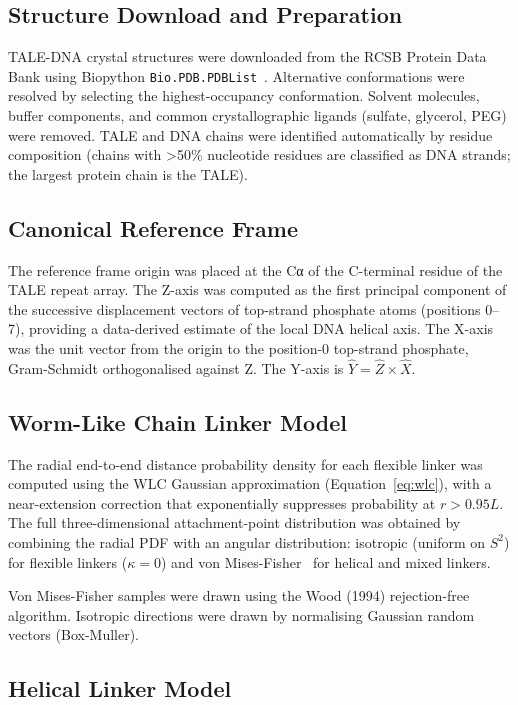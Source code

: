 \documentclass[11pt,a4paper]{article}
\begin{document}
\subsection{Structure Download and Preparation}

TALE-DNA crystal structures were downloaded from the RCSB Protein Data Bank using
Biopython \texttt{Bio.PDB.PDBList}~\citep{Cock2009}. Alternative conformations were
resolved by selecting the highest-occupancy conformation. Solvent molecules, buffer
components, and common crystallographic ligands (sulfate, glycerol, PEG) were removed.
TALE and DNA chains were identified automatically by residue composition (chains with
>50\% nucleotide residues are classified as DNA strands; the largest protein chain
is the TALE).

\subsection{Canonical Reference Frame}

The reference frame origin was placed at the Cα of the C-terminal residue of the TALE
repeat array. The Z-axis was computed as the first principal component of the successive
displacement vectors of top-strand phosphate atoms (positions 0--7), providing a
data-derived estimate of the local DNA helical axis. The X-axis was the unit vector
from the origin to the position-0 top-strand phosphate, Gram-Schmidt orthogonalised
against Z. The Y-axis is $\hat{Y} = \hat{Z} \times \hat{X}$.

\subsection{Worm-Like Chain Linker Model}

The radial end-to-end distance probability density for each flexible linker was computed
using the WLC Gaussian approximation (Equation~\ref{eq:wlc}), with a near-extension
correction that exponentially suppresses probability at $r > 0.95L$. The full
three-dimensional attachment-point distribution was obtained by combining the radial PDF
with an angular distribution: isotropic (uniform on $S^2$) for flexible linkers
($\kappa = 0$) and von Mises-Fisher~\citep{Mardia1999} for helical and mixed linkers.

Von Mises-Fisher samples were drawn using the Wood (1994) rejection-free algorithm.
Isotropic directions were drawn by normalising Gaussian random vectors (Box-Muller).

\subsection{Helical Linker Model}
\end{document}
